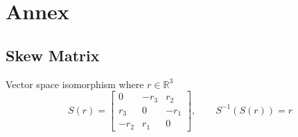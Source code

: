 \section{Annex} 

\subsection{Skew Matrix}
Vector space isomorphism where $r \in \mathbb{R}^3$
\begin{equation}
    S(r)
=
\begin{bmatrix}
0 & -r_3 & r_2 \\
r_3 & 0 & -r_1 \\
-r_2 & r_1 & 0
\end{bmatrix},
\qquad
S^{-1}\left(S(r)\right) = r
\tag{A1}
\label{annex:skew_matrix}
\end{equation}


